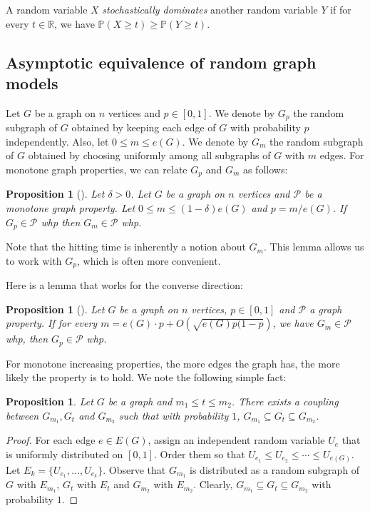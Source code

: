 \documentclass[reqno,final,a4paper]{amsart}
\numberwithin{equation}{section}
\newtheorem{proposition}[theorem]{Proposition}
\theoremstyle{definition}
\theoremstyle{remark}
\newcommand{\R}{\mathbb{R}}
\renewcommand{\Pr}{\mathbb{P}}
\def\calP{\mathcal{P}}
\begin{document}
A random variable $X$ \emph{stochastically dominates} another random variable $Y$ if for every $t\in \R$, we have $\Pr(X\geq t)\geq \Pr(Y\geq t)$.




\subsection{Asymptotic equivalence of random graph models}
Let $G$ be a graph on $n$ vertices and $p\in [0,1]$. We denote by $G_p$ the random subgraph of $G$ obtained by keeping each edge of $G$ with probability $p$ independently. Also, let $0\leq m\leq e(G)$. We denote by $G_m$ the random subgraph of $G$ obtained by choosing uniformly among all subgraphs of $G$ with $m$ edges. For monotone graph properties, we can relate $G_p$ and $G_m$ as follows:
\begin{proposition}[\cite{random-graph-book}]\label{prop:model-equiv}
    Let $\delta > 0$.
    Let $G$ be a graph on $n$ vertices and $\mathcal P$ be a monotone graph property. Let $0\leq m\leq (1-\delta) e(G)$ and $p = m/e(G)$. If $G_p\in \calP$ whp then $G_m\in \calP$ whp.
\end{proposition}
Note that the hitting time is inherently a notion about $G_m$. This lemma allows us to work with $G_p$, which is often more convenient.  

Here is a lemma that works for the converse direction:
\begin{proposition}[\cite{random-graph-book}]\label{prop:Gm-to-Gp} 
    Let $G$ be a graph on $n$ vertices, $p\in [0,1]$ and $\calP$ a graph property. If for every $m = e(G)\cdot p+ O(\sqrt{e(G)p(1-p})$, we have $G_m\in \calP$ whp, then $G_p\in \calP$ whp.
\end{proposition}

For monotone increasing properties, the more edges the graph has, the more likely the property is to hold. We note the following simple fact:
\begin{proposition}\label{prop:monotonicity-m}
    Let $G$ be a graph and $m_1\leq t\leq m_2$. 
    There exists a coupling between $G_{m_1}, G_t$ and $G_{m_2}$ such that with probability $1$, $G_{m_1}\subseteq G_t\subseteq G_{m_2}$. 
\end{proposition}
\begin{proof}
    For each edge $e\in E(G)$, assign an independent random variable $U_e$ that is uniformly distributed on $[0,1]$. Order them so that $U_{e_1}\leq U_{e_2}\leq \cdots \leq U_{e(G)}$. 
    Let $E_k = \{U_{e_1},\dots, U_{e_k}\}$. Observe that $G_{m_1}$ is distributed as a random subgraph of $G$ with $E_{m_1}$, $G_t$ with $E_{t}$ and $G_{m_2}$ with $E_{m_2}$. 
    Clearly, $G_{m_1}\subseteq G_t\subseteq G_{m_2}$ with probability $1$.
\end{proof}
\end{document}
